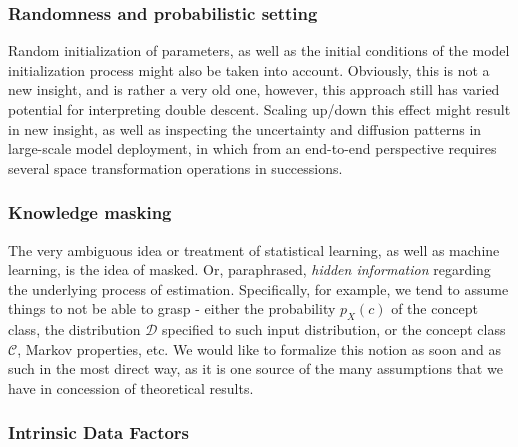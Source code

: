 \documentclass[10pt]{article} %
\begin{document}
\subsubsection{Randomness and probabilistic setting}
Random initialization of parameters, as well as the initial conditions of the model initialization process might also be taken into account. Obviously, this is not a new insight, and is rather a very old one, however, this approach still has varied potential for interpreting double descent. Scaling up/down this effect might result in new insight, as well as inspecting the uncertainty and diffusion patterns in large-scale model deployment, in which from an end-to-end perspective requires several space transformation operations in successions.
\subsubsection{Knowledge masking}
The very ambiguous idea or treatment of statistical learning, as well as machine learning, is the idea of masked. Or, paraphrased, \textit{hidden information} regarding the underlying process of estimation. Specifically, for example, we tend to assume things to not be able to grasp - either the probability $p_{X}(c)$ of the concept class, the distribution $\mathcal{D}$ specified to such input distribution, or the concept class $\mathcal{C}$, Markov properties, etc. We would like to formalize this notion as soon and as such in the most direct way, as it is one source of the many assumptions that we have in concession of theoretical results. 
\subsubsection{Intrinsic Data Factors}
\end{document}
